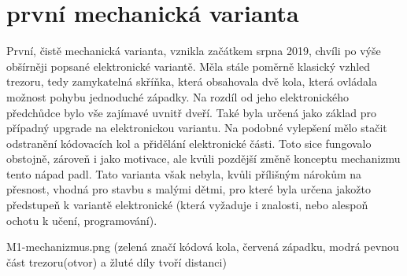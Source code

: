 \chapter*{první mechanická varianta}
První, čistě mechanická varianta, vznikla začátkem srpna 2019, chvíli po výše obšírněji popsané elektronické variantě.
Měla stále poměrně klasický vzhled trezoru, tedy zamykatelná skříňka, která obsahovala dvě kola, která ovládala možnost pohybu jednoduché západky.
Na rozdíl od jeho elektronického předchůdce bylo vše zajímavé uvnitř dveří. Také byla určená jako základ pro případný upgrade na elektronickou
variantu. Na podobné vylepšení mělo stačit odstranění kódovacích kol a přidělání elektronické části. Toto sice fungovalo obstojně, zároveň 
i jako motivace, ale kvůli pozdější změně konceptu mechanizmu tento nápad padl.
Tato varianta však nebyla, kvůli přílišným nárokům na přesnost, vhodná pro stavbu s malými dětmi, pro které byla určena jakožto předstupeň 
k variantě elektronické (která vyžaduje i znalosti, nebo alespoň ochotu k učení, programování).

M1-mechanizmus.png (zelená značí kódová kola, červená západku, modrá pevnou část trezoru(otvor) a žluté díly tvoří distanci)